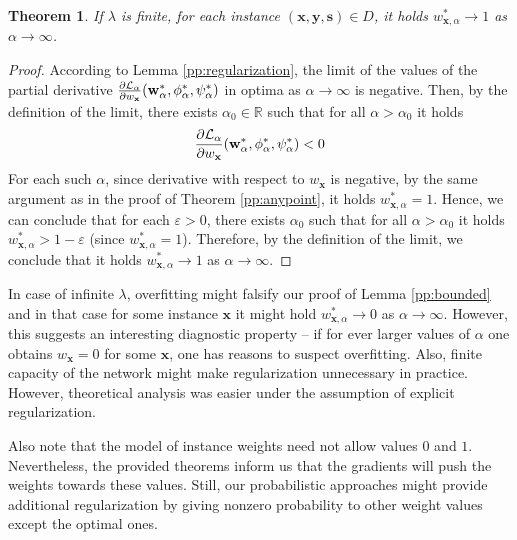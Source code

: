 \documentclass[preprint,12pt]{elsarticle}
\newtheorem{theorem}{Theorem}
\begin{document}
\begin{theorem}
	If $\lambda$ is finite, for each instance $(\mathbf{x},\mathbf{y},\mathbf{s})\in D$, it holds $w_{\mathbf{x},\alpha}^*\rightarrow 1$ as $\alpha\rightarrow\infty$.
	\label{pp:infty}
\end{theorem}
\begin{proof}
	According to Lemma \ref{pp:regularization},
	the limit of the values of the partial derivative $\frac{\partial{\cal L}_\alpha}{\partial w_\mathbf{x}}(\mathbf{w}^*_\alpha,\phi^*_\alpha,\psi^*_\alpha)$ in optima as $\alpha\rightarrow\infty$ is negative. Then, by the definition of the limit, there exists $\alpha_0\in \mathbb{R}$ such that for all $\alpha>\alpha_0$ it holds
	$$\frac{\partial{\cal L}_\alpha}{\partial w_\mathbf{x}}(\mathbf{w}^*_\alpha,\phi^*_\alpha,\psi^*_\alpha)<0$$
	For each such $\alpha$, since derivative with respect to $w_\mathbf{x}$ is negative, by the same argument as in the proof of Theorem \ref{pp:anypoint}, it holds $w^*_{\mathbf{x},\alpha}=1$. Hence, we can conclude that for each $\varepsilon>0$, there exists $\alpha_0$ such that for all $\alpha>\alpha_0$ it holds $w^*_{\mathbf{x},\alpha}>1-\varepsilon$  (since $w^*_{\mathbf{x},\alpha}=1$). Therefore, by the definition of the limit, we conclude that it holds $w^*_{\mathbf{x},\alpha}\rightarrow 1$ as $\alpha\rightarrow\infty$.
\end{proof}

In case of infinite $\lambda$, overfitting might falsify our proof of Lemma \ref{pp:bounded} and in that case for some instance $\mathbf{x}$ it might hold $w^*_{\mathbf{x},\alpha}\rightarrow 0$ as $\alpha\rightarrow\infty$. However, this suggests an interesting diagnostic property -- if for ever larger values of $\alpha$ one obtains $w_\mathbf{x}=0$ for some $\mathbf{x}$, one has reasons to suspect overfitting. Also, finite capacity of the network might make regularization
unnecessary in practice. However, theoretical analysis was easier under the assumption of explicit regularization.

Also note that the model of instance weights need not allow values $0$ and $1$. Nevertheless, the provided theorems inform us that the gradients will push the weights towards these values. Still, our probabilistic approaches might provide additional regularization by giving nonzero probability to other weight values except the optimal ones.
\end{document}
